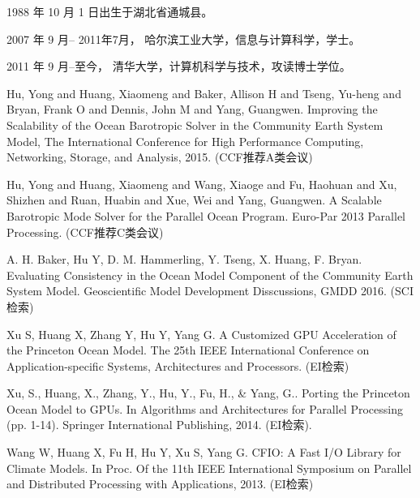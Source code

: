 \begin{resume}


  1988 年 10 月 1 日出生于湖北省通城县。

  2007 年 9 月-- 2011年7月， 哈尔滨工业大学，信息与计算科学，学士。

  2011 年 9 月--至今， 清华大学，计算机科学与技术，攻读博士学位。


  \begin{publications}
    \item Hu, Yong and Huang, Xiaomeng and Baker, Allison H and Tseng, Yu-heng and Bryan, Frank O and Dennis, John M and Yang, Guangwen. Improving the Scalability of the Ocean Barotropic Solver in the Community Earth System Model, The International Conference for High Performance Computing, Networking, Storage, and Analysis, 2015.  (CCF推荐A类会议)
    \item  Hu, Yong and Huang, Xiaomeng and Wang, Xiaoge and Fu, Haohuan and Xu, Shizhen and Ruan, Huabin and Xue, Wei and Yang, Guangwen. A Scalable Barotropic Mode Solver for the Parallel Ocean Program. Euro-Par 2013 Parallel Processing. (CCF推荐C类会议) 
  \end{publications}

  \begin{publications}[before=\publicationskip,after=\publicationskip]
    \item A. H. Baker, Hu Y, D. M. Hammerling, Y. Tseng, X. Huang, F. Bryan. Evaluating Consistency in the Ocean Model Component of the Community Earth System Model. Geoscientific Model Development Disscussions, GMDD 2016. (SCI检索)
  \end{publications}

  \begin{publications}
    \item Xu S, Huang X, Zhang Y, Hu Y, Yang G. A Customized GPU Acceleration of the Princeton Ocean Model. The 25th IEEE International Conference on Application-specific Systems, Architectures and Processors. (EI检索)
     \item  Xu, S., Huang, X., Zhang, Y., Hu, Y., Fu, H., & Yang, G.. Porting the Princeton Ocean Model to GPUs. In Algorithms and Architectures for Parallel Processing (pp. 1-14). Springer International Publishing, 2014. (EI检索).
    \item Wang W, Huang X, Fu H, Hu Y, Xu S, Yang G. CFIO: A Fast I/O Library for Climate Models. In Proc. Of the 11th IEEE International Symposium on Parallel and Distributed Processing with Applications, 2013. (EI检索)
    

\end{publications}
\end{resume}
